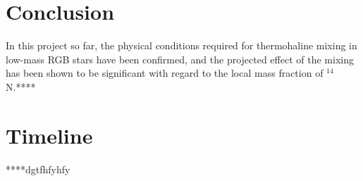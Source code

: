 \documentclass[12pt, a4paper]{report}
\begin{document}
\chapter{Conclusion}
In this project so far, the physical conditions required for thermohaline mixing in low-mass RGB stars have been confirmed, and the projected effect of the mixing has been shown to be significant with regard to the local mass fraction of $^{14}$N.****

\chapter{Timeline}
****dgtfhfyhfy


\end{document}
